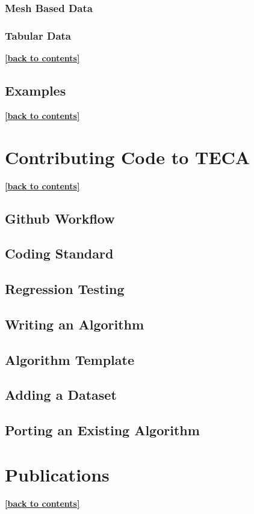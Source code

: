 \documentclass[a4paper,10pt,DIV=12]{scrreprt}
\begin{document}
\subsection{Mesh Based Data}
\subsection{Tabular Data}
\hyperlink{toc}{\footnotesize \bf [back to contents]}

\section{Examples}
\hyperlink{toc}{\footnotesize \bf [back to contents]}

\chapter{Contributing Code to TECA}
\hyperlink{toc}{\footnotesize \bf [back to contents]}
\section{Github Workflow}
\section{Coding Standard}
\section{Regression Testing}
\section{Writing an Algorithm}
\section{Algorithm Template}
\section{Adding a Dataset}
\section{Porting an Existing Algorithm}

\chapter{Publications}
\hyperlink{toc}{\footnotesize \bf [back to contents]}
\end{document}
